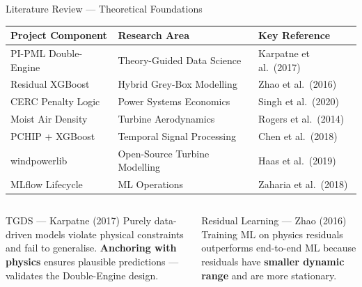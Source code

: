 \documentclass[aspectratio=169,10pt]{beamer}
\newcommand{\emphblue}[1]{{\color{WindBlue}\textbf{#1}}}
\newcommand{\emphgreen}[1]{{\color{MLgreen}\textbf{#1}}}
\begin{document}
\begin{frame}{Literature Review — Theoretical Foundations}
  \begin{center}
    \small\renewcommand{\arraystretch}{1.4}
    \begin{tabularx}{\textwidth}{@{}lXl@{}}
      \toprule
      \textbf{Project Component} & \textbf{Research Area} & \textbf{Key Reference} \\
      \midrule
      \rowcolor{WindBlue!8}
      PI-PML Double-Engine & Theory-Guided Data Science & Karpatne et al.\ (2017) \\
      Residual XGBoost & Hybrid Grey-Box Modelling & Zhao et al.\ (2016) \\
      \rowcolor{WindBlue!8}
      CERC Penalty Logic & Power Systems Economics & Singh et al.\ (2020) \\
      Moist Air Density & Turbine Aerodynamics & Rogers et al.\ (2014) \\
      \rowcolor{WindBlue!8}
      PCHIP + XGBoost & Temporal Signal Processing & Chen et al.\ (2018) \\
      windpowerlib & Open-Source Turbine Modelling & Haas et al.\ (2019) \\
      \rowcolor{WindBlue!8}
      MLflow Lifecycle & ML Operations & Zaharia et al.\ (2018) \\
      \bottomrule
    \end{tabularx}
  \end{center}

  \vspace{4pt}
  \begin{columns}[T]
      \begin{block}{TGDS — Karpatne (2017)}
        \small Purely data-driven models violate physical constraints and fail to generalise. \emphblue{Anchoring with physics} ensures plausible predictions — validates the Double-Engine design.
      \end{block}
      \begin{block}{Residual Learning — Zhao (2016)}
        \small Training ML on physics residuals outperforms end-to-end ML because residuals have \emphgreen{smaller dynamic range} and are more stationary.
      \end{block}
  \end{columns}
\end{frame}
\end{document}
